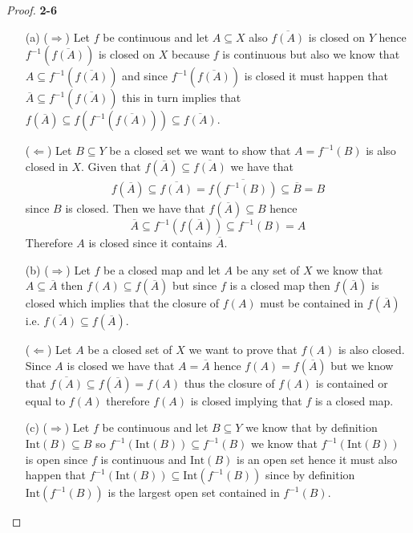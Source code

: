 \documentclass[11pt]{article}
\newcommand{\inter}{\text{Int}}
\theoremstyle{definition}
\begin{document}
\begin{proof}{\textbf{2-6}}
\begin{itemize}
    \item [(a)]
    ($\Rightarrow$) Let $f$ be continuous and let $A \subseteq X$ also
    $\overline{f(A)}$ is closed on $Y$ hence
    $f^{-1}(\overline{f(A)})$ is closed on $X$ because $f$ is
    continuous but also we know that
    $A \subseteq f^{-1}(\overline{f(A)})$ and since $f^{-1}(\overline{f(A)})$
    is closed it must happen that
    $\overline{A} \subseteq f^{-1}(\overline{f(A)})$ this in turn implies that
    $f(\overline{A}) \subseteq f(f^{-1}(\overline{f(A)})) \subseteq \overline{f(A)}$.
    
    ($\Leftarrow$) Let $B \subseteq Y$ be a closed set we want to show that
    $A = f^{-1}(B)$ is also closed in $X$. Given that
    $f(\overline{A}) \subseteq \overline{f(A)}$
    we have that
    \begin{align*}
        f(\overline{A}) \subseteq \overline{f(A)} =
        \overline{f(f^{-1}(B))} \subseteq \overline{B} = B
    \end{align*}
    since $B$ is closed. Then we have that $f(\overline{A}) \subseteq B$ hence
    $$\overline{A} \subseteq  f^{-1}(f(\overline{A})) \subseteq f^{-1}(B) = A$$
    Therefore $A$ is closed since it contains $\overline{A}$.

    \item [(b)]
    ($\Rightarrow$) Let $f$ be a closed map and let $A$ be any set of $X$
    we know that $A \subseteq \overline{A}$ then $f(A)\subseteq f(\overline{A})$
    but since $f$ is a closed map then $f(\overline{A})$ is closed which
    implies that the closure of $f(A)$ must be contained in $f(\overline{A})$
    i.e. $\overline{f(A)} \subseteq f(\overline{A})$.

    ($\Leftarrow$) Let $A$ be a closed set of $X$ we want to prove that $f(A)$
    is also closed. Since $A$ is closed we have that $A = \overline{A}$ hence
    $f(A) = f(\overline{A})$ but we know that
    $\overline{f(A)} \subseteq f(\overline{A}) = f(A)$
    thus the closure of $f(A)$ is contained or equal to $f(A)$ therefore
    $f(A)$ is closed implying that $f$ is a closed map.

    \item [(c)]
    ($\Rightarrow$) Let $f$ be continuous and let $B \subseteq Y$ we know that
    by definition $\inter(B) \subseteq B$ so $f^{-1}(\inter(B)) \subseteq f^{-1}(B)$ 
    we know that $f^{-1}(\inter(B))$ is open since $f$ is continuous and
    $\inter(B)$ is an open set hence it must also happen that
    $f^{-1}(\inter(B)) \subseteq \inter(f^{-1}(B))$ since by definition
    $\inter(f^{-1}(B))$ is the largest open set contained in $f^{-1}(B)$.


\end{itemize}
\end{proof}
\end{document}
